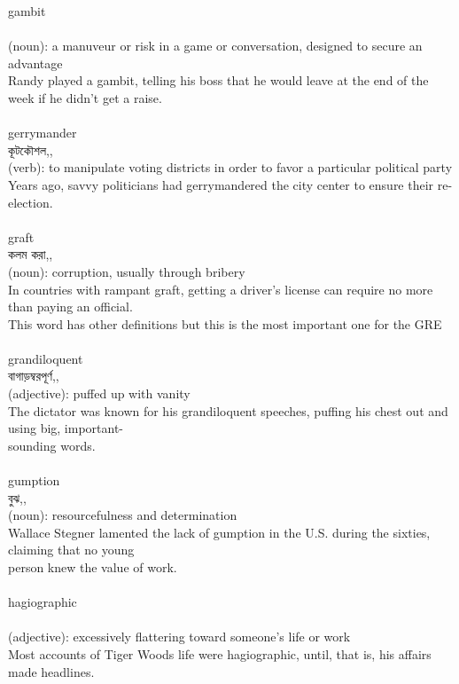 \documentclass{article}
\begin{document}
{{gambit}\\
{}\\
{(noun): a manuveur or risk in a game or conversation, designed to secure an advantage\\Randy played a gambit, telling his boss that he would leave at the end of the week if he didn't get a raise.\\}\\
{gerrymander}\\
{কূটকৌশল,,}\\
{(verb): to manipulate voting districts in order to favor a particular political party\\Years ago, savvy politicians had gerrymandered the city center to ensure their re-election.\\}\\
{graft}\\
{কলম করা,,}\\
{(noun): corruption, usually through bribery\\In countries with rampant graft, getting a driver's license can require no more than paying an official.\\This word has other definitions but this is the most important one for the GRE\\}\\
{grandiloquent}\\
{বাগাড়ম্বরপূর্ণ,,}\\
{(adjective): puffed up with vanity\\The dictator was known for his grandiloquent speeches, puffing his chest out and using big, important-\\sounding words.\\}\\
{gumption}\\
{বুঝ,,}\\
{(noun): resourcefulness and determination\\Wallace Stegner lamented the lack of gumption in the U.S. during the sixties, claiming that no young\\person knew the value of work.\\}\\
{hagiographic}\\
{}\\
{(adjective): excessively flattering toward someone's life or work\\Most accounts of Tiger Woods life were hagiographic, until, that is, his affairs made headlines.\\}\\
}
\end{document}
